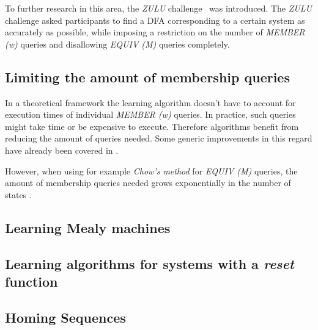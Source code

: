 \documentclass[multi,crop=false,class=article]{standalone}
\begin{document}
To further research in this area,
the \textit{ZULU} challenge~\cite{Combe10} was introduced.
The \textit{ZULU} challenge asked participants to find a DFA corresponding
to a certain system as accurately as possible, while imposing a restriction
on the number of \textit{MEMBER (w)} queries and disallowing \textit{EQUIV (M)}
queries completely.

\subsection{Limiting the amount of membership queries}
In a theoretical framework the learning algorithm doesn't have to account
for execution times of individual \textit{MEMBER (w)} queries.
In practice, such queries might take time or be expensive to execute.
Therefore algorithms benefit from reducing the amount of queries needed.
Some generic improvements in this regard have already been covered in
.

However, when using for example \textit{Chow's method} for \textit{EQUIV (M)}
queries, the amount of membership queries needed grows exponentially
in the number of states .


\subsection{Learning Mealy machines}

\subsection{Learning algorithms for systems with a \textit{reset} function}

\subsection{Homing Sequences}
\end{document}
